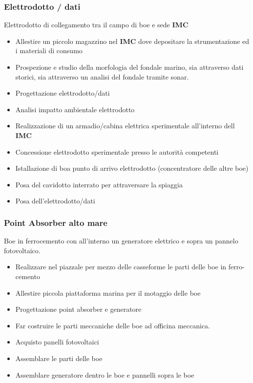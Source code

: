 \documentclass[
  onecolumn]{report}
\begin{document}
\hypertarget{elettrodotto-dati}{%
\subsubsection{Elettrodotto / dati}\label{elettrodotto-dati}}

Elettrodotto di collegamento tra il campo di boe e sede \textbf{IMC}

\begin{itemize}
\item
  Allestire un piccolo magazzino nel \textbf{IMC} dove depositare la
  strumentazione ed i materiali di consumo
\item
  Prospezione e studio della morfologia del fondale marino, sia
  attraverso dati storici, sia attraverso un analisi del fondale tramite
  sonar.
\item
  Progettazione elettrodotto/dati
\item
  Analisi impatto ambientale elettrodotto
\item
  Realizzazione di un armadio/cabina elettrica sperimentale all'interno
  dell \textbf{IMC}
\item
  Concessione elettrodotto sperimentale presso le autorità competenti
\item
  Istallazione di boa punto di arrivo elettrodotto (concentratore delle
  altre boe)
\item
  Posa del cavidotto interrato per attraversare la spiaggia
\item
  Posa dell'elettrodotto/dati
\end{itemize}

\hypertarget{point-absorber-alto-mare}{%
\subsubsection{Point Absorber alto
mare}\label{point-absorber-alto-mare}}

Boe in ferrocemento con all'interno un generatore elettrico e sopra un
pannelo fotovoltaico.

\begin{itemize}
\item
  Realizzare nel piazzale per mezzo delle casseforme le parti delle boe
  in ferro-cemento
\item
  Allestire piccola piattaforma marina per il motaggio delle boe
\item
  Progettazione point absorber e generatore
\item
  Far costruire le parti meccaniche delle boe ad officina meccanica.
\item
  Acquisto panelli fotovoltaici
\item
  Assemblare le parti delle boe
\item
  Assemblare generatore dentro le boe e pannelli sopra le boe
\end{itemize}
\end{document}
